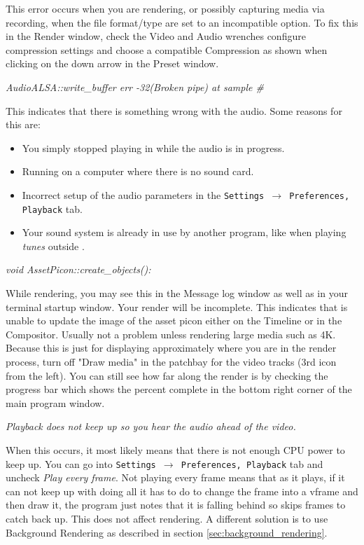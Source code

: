 This error occurs when you are rendering, or possibly capturing media via recording, when the
file format/type are set to an incompatible option.  To fix this in the Render window, check
the Video and Audio wrenches configure compression settings and choose a compatible Compression
as shown when clicking on the down arrow in the Preset window.
\bigskip

\textit{AudioALSA::write\_buffer err -32(Broken pipe) at sample \#}

This indicates that there is something wrong with the audio. Some reasons for this are:
\begin{itemize}[nosep]
	\item You simply stopped playing in \CGG{} while the audio is in progress.
	\item Running on a computer where there is no sound card.
	\item Incorrect setup of the audio parameters in the \texttt{Settings $\rightarrow$ Preferences, Playback} tab.
	\item Your sound system is already in use by another program, like when playing \textit{tunes} outside \CGG{}.
\end{itemize}
\bigskip

\textit{void AssetPicon::create\_objects():}

While rendering, you may see this in the Message log window as well as in your terminal startup window. Your render will be incomplete. This indicates that \CGG{} is unable to update the image of the asset picon either on the Timeline or in the Compositor. Usually not a problem unless rendering large media such as 4K.  Because this is just for displaying approximately where you are in the render process, turn off "Draw media" in the patchbay for the video tracks (3rd icon from the left).  You can still see how far along the render is by checking the progress bar which shows the percent complete in the bottom right corner of the main program window.
\bigskip

\textit{Playback does not keep up so you hear the audio ahead of the video.}

When this occurs, it most likely means that there is not enough CPU power to keep up. You can go into \texttt{Settings $\rightarrow$ Preferences, Playback} tab and uncheck \textit{Play every frame}. Not playing every frame means that as it plays, if it can not keep up with doing all it has to do to change the frame into a vframe and then draw it, the program just notes that it is falling behind so skips frames to catch back up. This does not affect rendering. A different solution is to use Background Rendering as described in section \ref{sec:background_rendering}.
\bigskip

